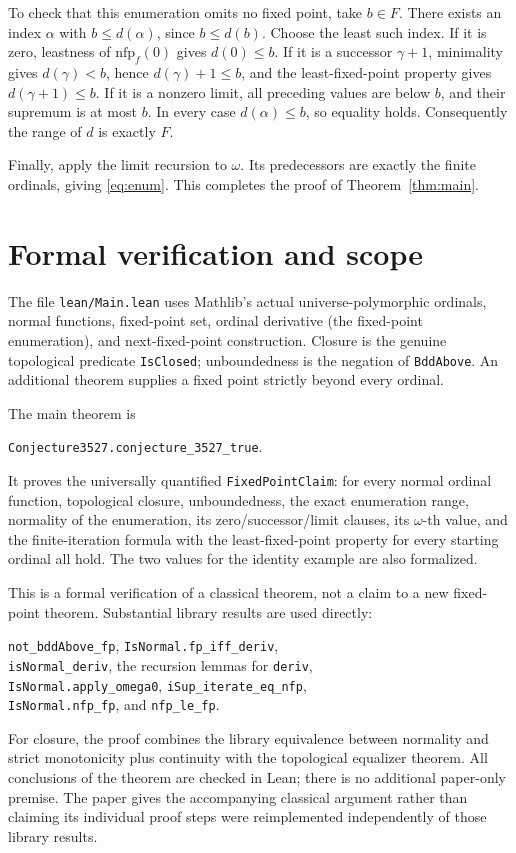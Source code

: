 \documentclass[11pt]{article}
\newcommand{\nfp}{\mathrm{nfp}}
\begin{document}
To check that this enumeration omits no fixed point, take $b\in F$.
There exists an index $\alpha$ with $b\leq d(\alpha)$, since $b\leq d(b)$.
Choose the least such index. If it is zero, leastness of
$\nfp_f(0)$ gives $d(0)\leq b$. If it is a successor $\gamma+1$,
minimality gives $d(\gamma)<b$, hence $d(\gamma)+1\leq b$, and the
least-fixed-point property gives $d(\gamma+1)\leq b$. If it is a
nonzero limit, all preceding values are below $b$, and their supremum is
at most $b$. In every case $d(\alpha)\leq b$, so equality holds.
Consequently the range of $d$ is exactly $F$.

Finally, apply the limit recursion to $\omega$. Its predecessors are
exactly the finite ordinals, giving \eqref{eq:enum}. This completes the
proof of Theorem~\ref{thm:main}.

\section*{Formal verification and scope}
The file \texttt{lean/Main.lean} uses Mathlib's actual universe-polymorphic
ordinals, normal functions, fixed-point set, ordinal derivative (the
fixed-point enumeration), and next-fixed-point construction. Closure is
the genuine topological predicate \texttt{IsClosed}; unboundedness is
the negation of \texttt{BddAbove}. An additional theorem supplies a fixed
point strictly beyond every ordinal.

The main theorem is
\begin{center}\texttt{Conjecture3527.conjecture\_3527\_true}.\end{center}
It proves the universally quantified \texttt{FixedPointClaim}: for every
normal ordinal function, topological closure, unboundedness, the exact
enumeration range, normality of the enumeration, its zero/successor/limit
clauses, its $\omega$-th value, and the finite-iteration formula with the
least-fixed-point property for every starting ordinal all hold.
The two values for the identity example are also formalized.

This is a formal verification of a classical theorem, not a claim to a new
fixed-point theorem. Substantial library results are used directly:
\begin{center}\small
\texttt{not\_bddAbove\_fp}, \texttt{IsNormal.fp\_iff\_deriv},\\
\texttt{isNormal\_deriv}, the recursion lemmas for \texttt{deriv},\\
\texttt{IsNormal.apply\_omega0}, \texttt{iSup\_iterate\_eq\_nfp},\\
\texttt{IsNormal.nfp\_fp}, and \texttt{nfp\_le\_fp}.
\end{center}
For closure, the proof combines the library equivalence between normality
and strict monotonicity plus continuity with the topological equalizer
theorem. All conclusions of the theorem are checked in Lean; there is no
additional paper-only premise. The paper gives the accompanying classical
argument rather than claiming its individual proof steps were reimplemented
independently of those library results.
\end{document}
